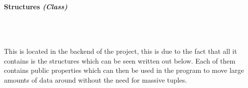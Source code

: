\begin{FlushLeft}
    \bk

    \pagebreak
\paragraph{Structures \textit{(Class)}} \mbox{} \\

    \begin{figure}[H]
        \centering
    \end{figure}\\

    This is located in the backend of the project, this is due to the fact that all it contains is the structures which can be seen written out below. Each of them contains public properties which can then be used in the program to move large amounts of data around without the need for massive tuples.

    \begin{figure}[H]
        \centering
    \end{figure}\\



\end{FlushLeft}
